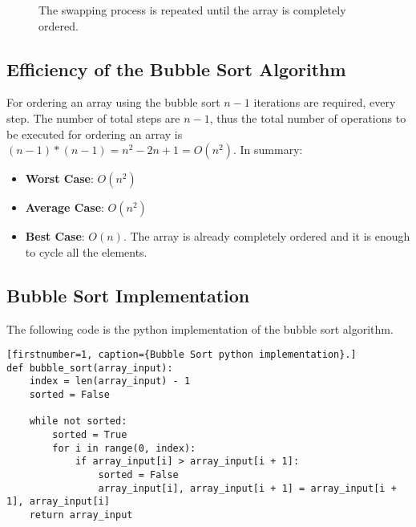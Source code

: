 \begin{figure}[H]

\caption[The swapping process is repeated until the array is completely ordered.]{The swapping process is repeated until the array is completely ordered.}
\label{sorting_4}
\end{figure}

\subsection{Efficiency of the Bubble Sort Algorithm}
For ordering an array using the bubble sort \(n - 1\) iterations are required, every step. The number of total steps are \(n - 1\), thus the total number of operations to be executed for ordering an array is \((n - 1)*(n - 1) = n^{2} - 2n + 1 = O(n^{2})\).
In summary:
\begin{itemize}
\item \textbf{Worst Case}: \(O(n^{2})\)
\item \textbf{Average Case}: \(O(n^{2})\)
\item \textbf{Best Case}: \(O(n)\). The array is already completely ordered and it is enough to cycle all the elements.
\end{itemize} 

\subsection{Bubble Sort Implementation}
The following code is the python implementation of the bubble sort algorithm.
\begin{lstlisting}[firstnumber=1, caption={Bubble Sort python implementation}.]
def bubble_sort(array_input):
	index = len(array_input) - 1
	sorted = False
	
	while not sorted:
		sorted = True
		for i in range(0, index):
			if array_input[i] > array_input[i + 1]:
				sorted = False
				array_input[i], array_input[i + 1] = array_input[i + 1], array_input[i]
	return array_input
\end{lstlisting}

